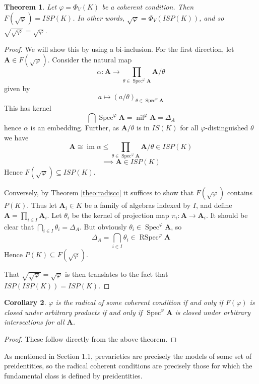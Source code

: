\documentclass{article}
\theoremstyle{plain}
\newtheorem{theorem}{Theorem}[section]
\newtheorem{corollary}[theorem]{Corollary}
\theoremstyle{definition}
\newcommand{\Spec}{\operatorname{Spec}}
\newcommand{\RSpec}{\operatorname{RSpec}}
\newcommand{\nil}{\operatorname{nil}}
\begin{document}
\begin{theorem} \label{theo:radfundclassisprevar}
    Let $\varphi = \Phi_V(K)$ be a coherent condition.
    Then $F(\sqrt{\varphi}) = ISP(K)$.
    In other words, $\sqrt{\varphi} = \Phi_V(ISP(K))$, and so $\sqrt{\sqrt{\varphi}} = \sqrt{\varphi}$.
\end{theorem}
\begin{proof}
    We will show this by using a bi-inclusion.
    For the first direction, let $\mathbf{A} \in F(\sqrt{\varphi})$.
    Consider the natural map 
    $$\alpha \colon \mathbf{A} \rightarrow \prod_{\theta \in \Spec^\varphi\mathbf{A}}\mathbf{A}/\theta$$
    given by 
    $$a \mapsto (a/\theta)_{\theta \in \Spec^\varphi\mathbf{A}}$$
    This has kernel
    $$\bigcap\Spec^\varphi\mathbf{A} = \nil^\varphi\mathbf{A} = \Delta_A$$
    hence $\alpha$ is an embedding.
    Further, as $\mathbf{A}/\theta$ is in $IS(K)$ for all $\varphi$-distinguished $\theta$ we have
    $$\mathbf{A} \cong \operatorname{im}\alpha \leq \prod_{\theta \in \Spec^\varphi\mathbf{A}}\mathbf{A}/\theta \in ISP(K)$$
    $$\implies \mathbf{A} \in ISP(K)$$
    Hence $F(\sqrt{\varphi}) \subseteq ISP(K)$.\par
    Conversely, by Theorem \ref{theo:radiscc} it suffices to show that $F(\sqrt{\varphi})$ contains $P(K)$.
    Thus let $\mathbf{A}_i \in K$ be a family of algebras indexed by $I$, and define $\mathbf{A} = \prod_{i \in I}\mathbf{A}_i$.
    Let $\theta_i$ be the kernel of projection map $\pi_i \colon \mathbf{A} \rightarrow \mathbf{A}_i$.
    It should be clear that $\bigcap_{i \in I} \theta_i = \Delta_A$.
    But obviously $\theta_i \in \Spec^\varphi\mathbf{A}$, so
    $$\Delta_A = \bigcap_{i \in I} \theta_i \in \RSpec^\varphi\mathbf{A}$$
    Hence $P(K) \subseteq F(\sqrt{\varphi})$.\par
    That $\sqrt{\sqrt{\varphi}} = \sqrt{\varphi}$ is then translates to the fact that $ISP(ISP(K)) = ISP(K)$.
\end{proof}

\begin{corollary}
    $\varphi$ is the radical of some coherent condition if and only if $F(\varphi)$ is closed under arbitrary products if and only if $\Spec^\varphi\mathbf{A}$ is closed under arbitrary intersections for all $\mathbf{A}$.
\end{corollary}
\begin{proof}
    These follow directly from the above theorem.
\end{proof}

As mentioned in Section 1.1, prevarieties are precisely the models of some set of preidentities, so the radical coherent conditions are precisely those for which the fundamental class is defined by preidentities.
\end{document}
